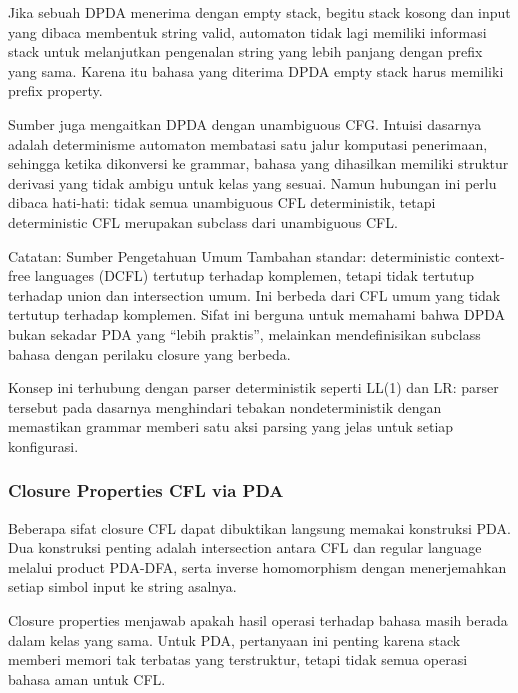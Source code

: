 Jika sebuah DPDA menerima dengan empty stack, begitu stack kosong dan input yang dibaca membentuk string valid, automaton tidak lagi memiliki informasi stack untuk melanjutkan pengenalan string yang lebih panjang dengan prefix yang sama. Karena itu bahasa yang diterima DPDA empty stack harus memiliki prefix property.

Sumber juga mengaitkan DPDA dengan unambiguous CFG. Intuisi dasarnya adalah determinisme automaton membatasi satu jalur komputasi penerimaan, sehingga ketika dikonversi ke grammar, bahasa yang dihasilkan memiliki struktur derivasi yang tidak ambigu untuk kelas yang sesuai. Namun hubungan ini perlu dibaca hati-hati: tidak semua unambiguous CFL deterministik, tetapi deterministic CFL merupakan subclass dari unambiguous CFL.

\begin{cmt}{Catatan: Sumber Pengetahuan Umum}{}
Tambahan standar: deterministic context-free languages (DCFL) tertutup terhadap komplemen, tetapi tidak tertutup terhadap union dan intersection umum. Ini berbeda dari CFL umum yang tidak tertutup terhadap komplemen. Sifat ini berguna untuk memahami bahwa DPDA bukan sekadar PDA yang ``lebih praktis'', melainkan mendefinisikan subclass bahasa dengan perilaku closure yang berbeda.
\end{cmt}

Konsep ini terhubung dengan parser deterministik seperti LL(1) dan LR: parser tersebut pada dasarnya menghindari tebakan nondeterministik dengan memastikan grammar memberi satu aksi parsing yang jelas untuk setiap konfigurasi.

\subsubsection{Closure Properties CFL via PDA}

\begin{jawab}
Beberapa sifat closure CFL dapat dibuktikan langsung memakai konstruksi PDA. Dua konstruksi penting adalah intersection antara CFL dan regular language melalui product PDA-DFA, serta inverse homomorphism dengan menerjemahkan setiap simbol input ke string asalnya.
\end{jawab}

Closure properties menjawab apakah hasil operasi terhadap bahasa masih berada dalam kelas yang sama. Untuk PDA, pertanyaan ini penting karena stack memberi memori tak terbatas yang terstruktur, tetapi tidak semua operasi bahasa aman untuk CFL.

